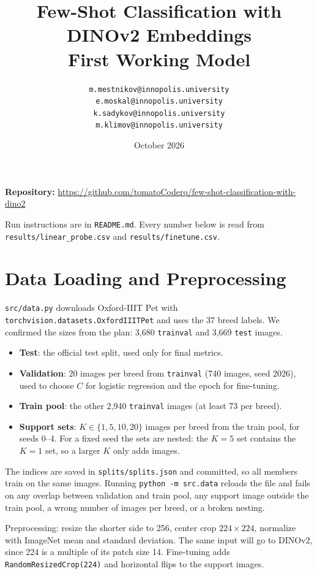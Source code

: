 \documentclass[11pt]{article}
\title{Few-Shot Classification with DINOv2 Embeddings\\
\large First Working Model}
\author{
    \texttt{m.mestnikov@innopolis.university}\\
    \texttt{e.moskal@innopolis.university}\\
    \texttt{k.sadykov@innopolis.university}\\
    \texttt{m.klimov@innopolis.university}
}
\date{October 2026}
\begin{document}
\maketitle

\textbf{Repository:}
\url{https://github.com/tomatoCoderq/few-shot-classification-with-dino2}

Run instructions are in \texttt{README.md}. Every number below is read from
\texttt{results/linear\_probe.csv} and \texttt{results/finetune.csv}.

\section{Data Loading and Preprocessing}

\texttt{src/data.py} downloads Oxford-IIIT Pet with
\texttt{torchvision.datasets.OxfordIIITPet} and uses the 37 breed labels.
We confirmed the sizes from the plan: 3,680 \texttt{trainval} and 3,669 \texttt{test} images.

\begin{itemize}
    \item \textbf{Test}: the official test split, used only for final metrics.
    \item \textbf{Validation}: 20 images per breed from \texttt{trainval} (740 images, seed 2026),
          used to choose $C$ for logistic regression and the epoch for fine-tuning.
    \item \textbf{Train pool}: the other 2,940 \texttt{trainval} images (at least 73 per breed).
    \item \textbf{Support sets}: $K \in \{1, 5, 10, 20\}$ images per breed from the train pool,
          for seeds 0--4. For a fixed seed the sets are nested: the $K=5$ set contains the $K=1$ set,
          so a larger $K$ only adds images.
\end{itemize}

The indices are saved in \texttt{splits/splits.json} and committed, so all members train on the
same images. Running \texttt{python -m src.data} reloads the file and fails on any overlap
between validation and train pool, any support image outside the train pool, a wrong number of
images per breed, or a broken nesting.

Preprocessing: resize the shorter side to 256, center crop $224 \times 224$, normalize with
ImageNet mean and standard deviation. The same input will go to DINOv2, since 224 is a multiple
of its patch size 14. Fine-tuning adds \texttt{RandomResizedCrop(224)} and horizontal flips to
the support images.
\end{document}
